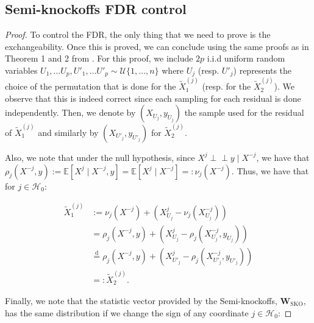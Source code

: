 \documentclass{article}
\theoremstyle{plain}
\theoremstyle{definition}
\theoremstyle{remark}
\newcommand{\indep}{\perp\!\!\!\perp}
\newcommand{\e}[1]{\mathbb{E}\left[#1\right]  } %
\begin{document}
\subsection{Semi-knockoffs FDR control}

\begin{proof}
 To control the FDR, the only thing that we need to prove is the exchangeability. Once this is proved, we can conclude using the same proofs as in Theorem 1 and 2 from \cite{barber-candes2015}. For this proof, we include $2p$ i.i.d uniform random variables $U_1, \ldots U_p, U'_1, \ldots U'_p\sim \mathcal{U}\{1, \ldots, n\}$ where $U_j$ (resp. $U'_j$) represents the choice of the permutation that is done for the $\widetilde{X}^{(j)}_1$ (resp. for the $\widetilde{X}^{(j)}_2$). We observe that this is indeed correct since each sampling for each residual is done independently. Then, we denote by $(X_{U_j}, y_{U_j})$ the sample used for the residual of $\widetilde{X}^{(j)}_1$ and similarly by $(X_{U'_j}, y_{U'_j})$ for $\widetilde{X}^{(j)}_2$.
 
 Also, we note that under the null hypothesis, since $X^j\indep y\mid X^{-j}$, we have that $\rho_j(X^{-j}, y):=\e{X^{j}\mid X^{-j}, y}=\e{X^{j}\mid X^{-j}}=: \nu_j(X^{-j})$. Thus, we have that for $j\in \mathcal{H}_0$:
 
 \begin{align*}
     \widetilde{X}^{(j)}_1&:=\nu_{j}(X^{-j})+\left(X^j_{U_j}-\nu_{j}(X^{-j}_{U_j})\right)\\
     &=\rho_{j}(X^{-j}, y)+\left(X^j_{U_j}-\rho_{j}(X^{-j}_{U_j}, y_{U_j})\right)\\
     &\overset{\mathrm{d}}{=}\rho_{j}(X^{-j}, y)+\left(X^j_{U'_j}-\rho_{j}(X^{-j}_{U'_j}, y_{U'_j})\right)\\
     &= :\widetilde{X}^{(j)}_2.
 \end{align*}
 

 
Finally, we note that the statistic vector provided by the Semi-knockoffs, $\mathbf{W}_\mathrm{SKO}$, has the same distribution if we change the sign of any coordinate $j \in \mathcal{H}_0$:


\end{proof}
\end{document}
